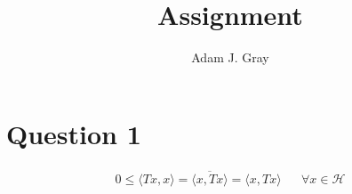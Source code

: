 \documentclass{unswmaths}
\begin{document}
\author{Adam J. Gray}
\title{Assignment}
\subject{Functional Analysis}

\unswtitle

\section*{Question 1}
\begin{align*}
	0 \leq \langle Tx, x \rangle = \overline{\langle x, Tx \rangle} = \langle x, Tx \rangle && \forall x \in \mathcal{H}
\end{align*}
\end{document}
